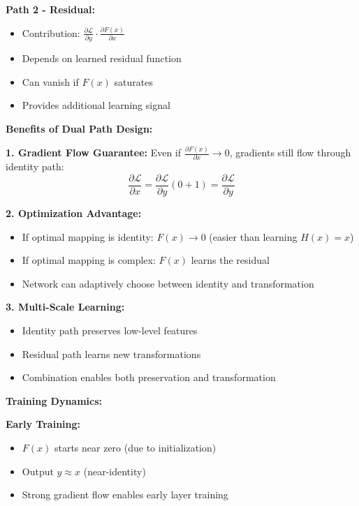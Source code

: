 \documentclass[12pt]{article}
\begin{document}
\begin{enumerate}[(a)]
{    \textbf{Path 2 - Residual:}
    \begin{itemize}
        \item Contribution: $\frac{\partial \mathcal{L}}{\partial y} \cdot \frac{\partial F(x)}{\partial x}$
        \item Depends on learned residual function
        \item Can vanish if $F(x)$ saturates
        \item Provides additional learning signal
    \end{itemize}
    
    \textbf{Benefits of Dual Path Design:}
    
    \textbf{1. Gradient Flow Guarantee:}
    Even if $\frac{\partial F(x)}{\partial x} \rightarrow 0$, gradients still flow through identity path:
    $$\frac{\partial \mathcal{L}}{\partial x} = \frac{\partial \mathcal{L}}{\partial y}(0 + 1) = \frac{\partial \mathcal{L}}{\partial y}$$
    
    \textbf{2. Optimization Advantage:}
    \begin{itemize}
        \item If optimal mapping is identity: $F(x) \rightarrow 0$ (easier than learning $H(x) = x$)
        \item If optimal mapping is complex: $F(x)$ learns the residual
        \item Network can adaptively choose between identity and transformation
    \end{itemize}
    
    \textbf{3. Multi-Scale Learning:}
    \begin{itemize}
        \item Identity path preserves low-level features
        \item Residual path learns new transformations
        \item Combination enables both preservation and transformation
    \end{itemize}
    
    \textbf{Training Dynamics:}
    
    \textbf{Early Training:}
    \begin{itemize}
        \item $F(x)$ starts near zero (due to initialization)
        \item Output $y \approx x$ (near-identity)
        \item Strong gradient flow enables early layer training
    \end{itemize}
    
}
\end{enumerate}
\end{document}
